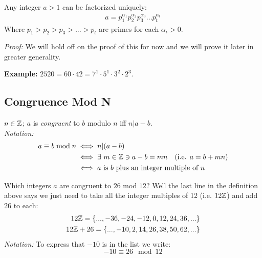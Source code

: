 \noindent \setcounter{dummy}{0}
\begin{theorem}
Any integer $a>1$ can be factorized uniquely:
\begin{align}
    a=p_1^{\alpha_1}p_2^{\alpha_2}p_3^{\alpha_3}...p_t^{\alpha_t}\nonumber
\end{align}
Where $p_1>p_2>p_3>...>p_t$ are primes for each $\alpha_i>0$.\steezybreak

\noindent\textit{Proof:} We will hold off on the proof of this for now and we will prove it later in
greater generality.\steezybreak

\end{theorem}

\textbf{Example:} $2520=60\cdot 42 = 7^1\cdot 5^1\cdot 3^2 \cdot 2^3$.
\subsection{Congruence Mod N}
\begin{definition}
$n\in {\mathbb{Z}}$; $a$ is \textit{congruent} to $b$ modulo $n$ iff $n|a-b$.\\
\textit{Notation:}
\begin{align}
    a\equiv b \bmod n &\iff n|(a-b) \nonumber \\
    &\iff \exists \ m\in {\mathbb{Z}} \ni a-b=mn \ \ \ (\text{i.e. } a=b+mn) \nonumber \\
    &\iff a \text{ is } b \text{ plus an integer multiple of } n \nonumber
\end{align}
\end{definition}
\begin{example}
Which integers $a$ are congruent to $26$ mod $12$? Well the last line in the definition above says
we just need to take all the integer multiples of 12 (i.e. $12{\mathbb{Z}}$) and add $26$ to each:
\begin{align}
    12{\mathbb{Z}}= \{...,-36,-24,-12,0,12,24,36,...\}\nonumber\\
    12{\mathbb{Z}}+26= \{...,-10,2,14,26,38,50,62,...\}\nonumber
\end{align}
\textit{Notation:} To express that $-10$ is in the list we write:
\begin{equation}
    -10\equiv 26 \mod 12 \nonumber
\end{equation}
\end{example}
